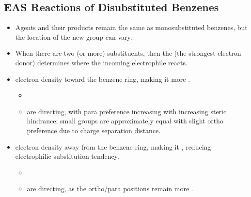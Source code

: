 \begin{itemize}
  \subsection{EAS Reactions of Disubstituted Benzenes}\label{EAS reactions of Disubstituted Benzenes}
  \begin{itemize}
      \item Agents and their products remain the same as monosubstituted benzenes, but the location of the new group can vary.
      \item When there are two (or more) substituents, then the  (the strongest electron donor) determines where the incoming electrophile reacts.
      \item {} electron density toward the benzene ring, making it more . 
        \begin{itemize}
          \item {}
          \item {} are  directing, with para preference increasing with increasing steric hindrance; small groups are approximately equal with slight ortho preference due to charge separation distance.
        \end{itemize}
      \item {} electron density away from the benzene ring, making it , reducing electrophilic substitution tendency.
        \begin{itemize}
          \item {}
          \item {} are  directing, as the ortho/para positions remain more .  
        \end{itemize}
      
  \end{itemize}
  
\end{itemize}


